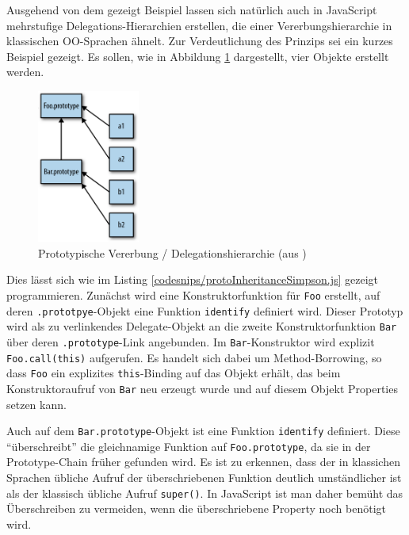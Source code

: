 \skippingparagraph

Ausgehend von dem gezeigt Beispiel lassen sich natürlich auch in JavaScript mehrstufige Delegations-Hierarchien erstellen, die einer Vererbungshierarchie in klassischen OO-Sprachen ähnelt. Zur Verdeutlichung des Prinzips sei ein kurzes Beispiel gezeigt. Es sollen, wie in Abbildung \ref{protoInheritance} dargestellt, vier Objekte erstellt werden.

\begin{figure}[!h]
	\centering
	\includegraphics[width=0.3\textwidth]{images/prototypalInheritance.png}
	\caption{\label{protoInheritance}Prototypische Vererbung / Delegationshierarchie (aus \citep[p. 93]{SimpsonThisobjectprototypes2014})}
\end{figure}

Dies lässt sich wie im Listing \ref{codesnips/protoInheritanceSimpson.js} gezeigt programmieren. Zunächst wird eine Konstruktorfunktion für \texttt{Foo} erstellt, auf deren \texttt{.prototpye}-Objekt eine Funktion \texttt{identify} definiert wird. Dieser Prototyp wird als zu verlinkendes Delegate-Objekt an die zweite Konstruktorfunktion \texttt{Bar} über deren \texttt{.prototype}-Link angebunden. Im \texttt{Bar}-Konstruk\-tor wird explizit \texttt{Foo.call(this)} aufgerufen. Es handelt sich dabei um Method-Borrow\-ing, so dass \texttt{Foo} ein explizites \texttt{this}-Binding auf das Objekt erhält, das beim Konstruktoraufruf von \texttt{Bar} neu erzeugt wurde und auf diesem Objekt Properties setzen kann. 

Auch auf dem \texttt{Bar.prototype}-Objekt ist eine Funktion \texttt{identify} definiert. Diese "`überschreibt"' die gleichnamige Funktion auf \texttt{Foo.prototype}, da sie in der Prototype-Chain früher gefunden wird. Es ist zu erkennen, dass der in klassichen Sprachen übliche Aufruf der überschriebenen Funktion deutlich umständlicher ist als der klassisch übliche Aufruf \texttt{super()}. In JavaScript ist man daher bemüht das Überschreiben zu vermeiden, wenn die überschriebene Property noch benötigt wird.


